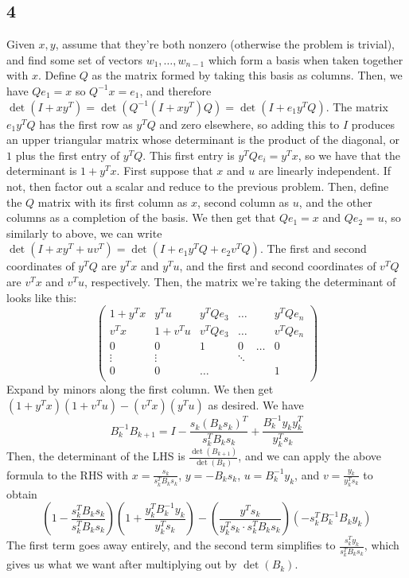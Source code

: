 \documentclass{article}
\newcommand{\openm}{\begin{pmatrix}}
\newcommand{\closem}{\end{pmatrix}}
\begin{document}
\subsection*{4}
Given $x, y$, assume that they're both nonzero (otherwise the problem is trivial), and find some set of vectors $w_1,\ldots,w_{n-1}$ which form a basis when taken together with $x$. Define $Q$ as the matrix formed by taking this basis as columns. Then, we have $Qe_1=x$ so $Q^{-1}x=e_1$, and therefore $\det(I+xy^T)=\det(Q^{-1}(I+xy^T)Q)=\det(I+e_1y^TQ)$. The matrix $e_1y^TQ$ has the first row as $y^TQ$ and zero elsewhere, so adding this to $I$ produces an upper triangular matrix whose determinant is the product of the diagonal, or $1$ plus the first entry of $y^TQ$. This first entry is $y^TQe_i=y^Tx$, so we have that the determinant is $1+y^Tx$.
First suppose that $x$ and $u$ are linearly independent. If not, then factor out a scalar and reduce to the previous problem. Then, define the $Q$ matrix with its first column as $x$, second column as $u$, and the other columns as a completion of the basis. We then get that $Qe_1=x$ and $Qe_2=u$, so similarly to above, we can write $\det(I+xy^T+uv^T)=\det(I+e_1y^TQ+e_2v^TQ)$. The first and second coordinates of $y^TQ$ are $y^Tx$ and $y^Tu$, and the first and second coordinates of $v^TQ$ are $v^Tx$ and $v^Tu$, respectively. Then, the matrix we're taking the determinant of looks like this:
\[\openm 1+y^Tx&y^Tu&y^TQe_3&\hdots&&y^TQe_n\\
v^Tx&1+v^Tu&v^TQe_3&\hdots&&v^TQe_n\\
0&0&1&0&\hdots&0\\
\vdots&\vdots&&\ddots\\
0&0&\hdots&&&1\\
\closem\]
Expand by minors along the first column. We then get $(1+y^Tx)(1+v^Tu)-(v^Tx)(y^Tu)$ as desired.
We have 
\[B_k^{-1}B_{k+1}=I-\frac{s_k(B_ks_k)^T}{s_k^TB_ks_k}+\frac{B_k^{-1}y_ky_k^T}{y_k^Ts_k}\]
Then, the determinant of the LHS is $\frac{\det(B_{k+1})}{\det(B_k)}$, and we can apply the above formula to the RHS with $x=\frac{s_k}{s_k^TB_ks_k}$, $y=-B_ks_k$, $u=B_k^{-1}y_k$, and $v=\frac{y_k}{y_k^Ts_k}$ to obtain
\[\left(1-\frac{s_k^TB_ks_k}{s_k^TB_ks_k}\right)\left(1+\frac{y_k^TB_k^{-1}y_k}{y_k^Ts_k}\right)-\left(\frac{y^Ts_k}{y_k^Ts_k\cdot s_k^TB_ks_k}\right)\left(-s_k^TB_k^{-1}B_ky_k\right)
\]
The first term goes away entirely, and the second term simplifies to $\frac{s_k^Ty_k}{s_k^TB_ks_k}$, which gives us what we want after multiplying out by $\det(B_k)$.
\end{document}
